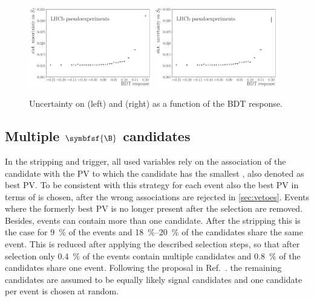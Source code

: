 \begin{figure}[tbp]
    \centering
    \includegraphics[width=0.48\textwidth]{07selection/figs/sensitiv_Sf.pdf}
    \includegraphics[width=0.48\textwidth]{07selection/figs/sensitiv_Sfbar.pdf}
    \caption{Uncertainty on \Sf (left) and \Sfbar (right) as a function of the \ac{BDT} response.}
    \label{fig:BDTopt}
\end{figure}

\subsection[head={Multiple \B candidates},tocentry={Multiple \B candidates}]{Multiple $\symbfsf{\B}$ candidates}
\label{sec:MultCands}

In the stripping and trigger, all used variables rely on the association of the \mbox{\Bz candidate} with the \ac{PV} to which the candidate has the smallest \chisqip, also denoted as best \ac{PV}.
To be consistent with this strategy for each event also the best \ac{PV} in terms of \chisqip is chosen, after the wrong associations are rejected in \cref{sec:vetoes}.
Events where the formerly best \ac{PV} is no longer present after the selection are removed.
Besides, events can contain more than one \mbox{\Bz candidate}.
After the stripping this is the case for \SI{9}{\percent} of the events and \SIrange[range-units=single]{18}{20}{\percent} of the \Bz candidates share the same event.
This is reduced after applying the described selection steps, so that after selection only \SI{0.4}{\percent} of the events contain multiple candidates and \SI{0.8}{\percent} of the \Bz candidates share one event.
Following the proposal in Ref.~\cite{Koppenburg:2017zsh}. the remaining candidates are assumed to be equally likely signal candidates and one candidate per event is chosen at random.

